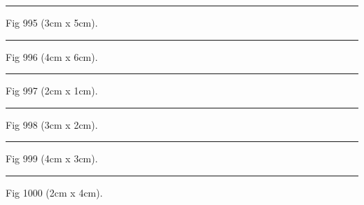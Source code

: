 \documentclass[a4paper,11pt]{article}
\begin{document}
\begin{swarmwrap}%
  \begin{minipage}[t]{3cm}
    \centering
    \rule{\linewidth}{5cm}
    {\footnotesize Fig 995 (3cm x 5cm).}
  \end{minipage}%
\end{swarmwrap}%
\swarmwrapnext
\lipsum[95]%

\begin{swarmwrap}%
  \begin{minipage}[t]{4cm}
    \centering
    \rule{\linewidth}{6cm}
    {\footnotesize Fig 996 (4cm x 6cm).}
  \end{minipage}%
\end{swarmwrap}%
\swarmwrapnext
\lipsum[96]%

\begin{swarmwrap}%
  \begin{minipage}[t]{2cm}
    \centering
    \rule{\linewidth}{1cm}
    {\footnotesize Fig 997 (2cm x 1cm).}
  \end{minipage}%
\end{swarmwrap}%
\swarmwrapnext
\lipsum[97]%

\begin{swarmwrap}%
  \begin{minipage}[t]{3cm}
    \centering
    \rule{\linewidth}{2cm}
    {\footnotesize Fig 998 (3cm x 2cm).}
  \end{minipage}%
\end{swarmwrap}%
\swarmwrapnext
\lipsum[98]%

\begin{swarmwrap}%
  \begin{minipage}[t]{4cm}
    \centering
    \rule{\linewidth}{3cm}
    {\footnotesize Fig 999 (4cm x 3cm).}
  \end{minipage}%
\end{swarmwrap}%
\swarmwrapnext
\lipsum[99]%

\begin{swarmwrap}%
  \begin{minipage}[t]{2cm}
    \centering
    \rule{\linewidth}{4cm}
    {\footnotesize Fig 1000 (2cm x 4cm).}
  \end{minipage}%
\end{swarmwrap}%
\swarmwrapnext
\lipsum[100]%
\end{document}
